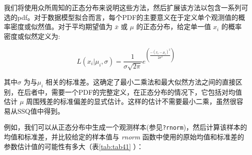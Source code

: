 \documentclass[
  lang=cn,
  11pt,
  scheme=chinese,
  chinesefont=nofont,
  citestyle=gb7714-2015,
  bibstyle=gb7714-2015]{elegantbook}
\begin{document}
我们将使用众所周知的正态分布来说明这些方法，然后扩展该方法以包含一系列可选的pdf。对于数据模型拟合而言，每个PDF的主要意义在于定义单个观测值的概率密度或似然值。对于平均期望值为 \(\bar x\) 或 \(\mu\) 的正态分布，给定单一值 \(x_i\) 的概率密度或似然定义为:

\begin{equation}  
L\left( {x_i}|\mu_{i} ,\sigma  \right)=\frac{1}{\sigma \sqrt{2\pi }}{{e}^{\left( \frac{-{{\left( {x_i}-\mu_{i}  \right)}^{2}}}{2\sigma^2 } \right)}}  
\label{eq:eq411}  
\end{equation}

其中\(\sigma\) 为与\(\mu_i\) 相关的标准差。这确定了最小二乘法和最大似然方法之间的直接区别，在后者中，需要一个PDF的完整定义，在正态分布的情况下，它包括对均值估计 \(\mu\) 周围残差的标准偏差的显式估计。这样的估计不需要最小二乘，虽然很容易从SSQ值中得到。

例如，我们可以从正态分布中生成一个观测样本(参见\texttt{?rnorm})，然后计算该样本的均值和标准差，并比较给定的样本值与 \emph{rnorm} 函数中使用的原始均值和标准差的参数估计值的可能性有多大（表\ref{tab:tab41} ）：
\end{document}
